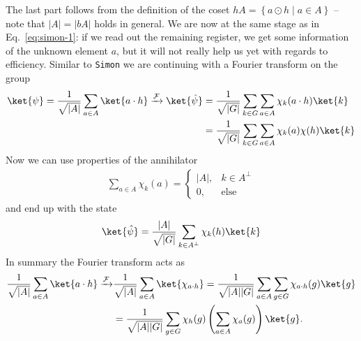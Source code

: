 The last part follows from the definition of the coset $hA = \left\{a\odot h \;|\; a\in A\right\}$ -- note that $|A| = |bA|$ holds in general.
We are now at the same stage as in Eq.~\eqref{eq:simon-1}: if we read out the remaining register, we get some information of the unknown element $a$, but it will not really help us yet with regards to efficiency. Similar to \texttt{Simon} we are continuing with a Fourier transform on the group 
\begin{align}
    \ket{\psi}=\frac{1}{\sqrt{|A|}} \sum_{a\in A} \ket{a\cdot h} \xrightarrow[]{\mathcal{F}} \ket{\hat{\psi}} &=\frac{1}{\sqrt{|G|}}\sum_{k\in G} \sum_{a\in A} \chi_k(a\cdot h) \ket{{k}} \nonumber\\
    &= \frac{1}{\sqrt{|G|}} \sum_{k\in G} \sum_{a\in A} \chi_k(a)\chi(h) \ket{k}\\
\end{align}
Now we can use properties of the annihilator
\begin{align}
    \sum_{a\in A}\chi_k(a) = \begin{cases}
        |A|, & k\in A^\perp \\
        0 , & \text{else}
    \end{cases}
\end{align}
and end up with the state
\begin{align}
    \ket{\hat{\psi}}=\frac{|A|}{\sqrt{|G|}} \sum_{k\in A^\perp} \chi_k(h) \ket{k}\\
\end{align}
In summary the Fourier transform acts as
\begin{align}
     \frac{1}{\sqrt{|A|}} \sum_{a\in A} \ket{a\cdot h} \xrightarrow[]{\mathcal{F}} &\frac{1}{\sqrt{|A|}} \sum_{a\in A} \ket{\chi_{a\cdot h}} = \frac{1}{\sqrt{|A||G|}} \sum_{a\in A} \sum_{g\in G}\chi_{a\cdot h}(g)\ket{g}\nonumber\\
     &= \frac{1}{\sqrt{|A||G|}} \sum_{g\in G} \chi_h(g)\left(\sum_{a\in A}\chi_{a}(g)\right)\ket{g}.
\end{align}
